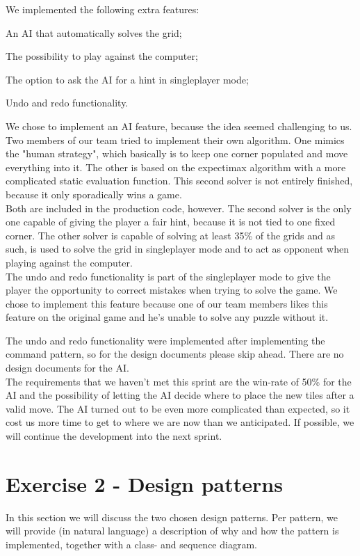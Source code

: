 \documentclass[a4paper,11pt,report]{scrartcl}
\begin{document}
We implemented the following extra features:
\begin{description}
	\item An AI that automatically solves the grid;
	\item The possibility to play against the computer;
	\item The option to ask the AI for a hint in singleplayer mode;
	\item Undo and redo functionality.
\end{description}

We chose to implement an AI feature, because the idea seemed challenging to us.
Two members of our team tried to implement their own algorithm. One mimics the
"human strategy", which basically is to keep one corner populated and move
everything into it. The other is based on the expectimax algorithm with a more
complicated static evaluation function. This second solver is not entirely
finished, because it only sporadically wins a game.\\

Both are included in the production code, however. The second solver is the only
one capable of giving the player a fair hint, because it is not tied to one
fixed corner. The other solver is capable of solving at least 35\% of the grids
and as such, is used to solve the grid in singleplayer mode and to act as
opponent when playing against the computer.\\

The undo and redo functionality is part of the singleplayer mode to give the
player the opportunity to correct mistakes when trying to solve the game. We
chose to implement this feature because one of our team members likes this
feature on the original game and he's unable to solve any puzzle without it.

The undo and redo functionality were implemented after implementing the command
pattern, so for the design documents please skip ahead. There are no design
documents for the AI.\\

The requirements that we haven't met this sprint are the win-rate of 50\% for
the AI and the possibility of letting the AI decide where to place the new tiles
after a valid move. The AI turned out to be even more complicated than expected,
so it cost us more time to get to where we are now than we anticipated. If
possible, we will continue the development into the next sprint.

\newpage\section{Exercise 2 - Design patterns}
In this section we will discuss the two chosen design patterns. Per pattern,
we will provide (in natural language) a description of why and how the pattern
is implemented, together with a class- and sequence diagram.
\end{document}
